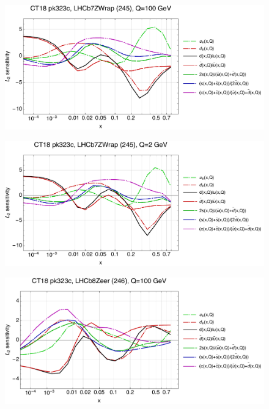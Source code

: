 \documentclass[10pt,aps,prd,floatfix,titlepage]{revtex4}
\begin{document}
\clearpage
\begin{figure}
\includegraphics[width=\textwidth,height=0.44\textheight,keepaspectratio]{2/245_ct18nn_q100_Sf_2.pdf}
\caption{}
\end{figure}
\begin{figure}
\includegraphics[width=\textwidth,height=0.44\textheight,keepaspectratio]{2/245_ct18nn_q2_Sf_2.pdf}
\caption{}
\end{figure}
\clearpage
\begin{figure}
\includegraphics[width=\textwidth,height=0.44\textheight,keepaspectratio]{2/246_ct18nn_q100_Sf_2.pdf}
\caption{}
\end{figure}
\end{document}
